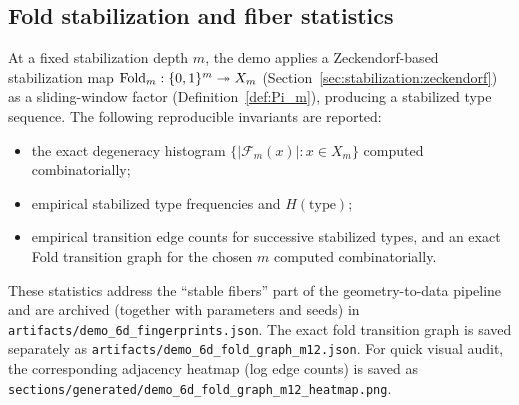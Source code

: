 \subsection{Fold stabilization and fiber statistics}
At a fixed stabilization depth $m$, the demo applies a Zeckendorf-based stabilization map $\mathrm{Fold}_m:\{0,1\}^m\twoheadrightarrow X_m$ (Section~\ref{sec:stabilization:zeckendorf}) as a sliding-window factor (Definition~\ref{def:Pi_m}), producing a stabilized type sequence. The following reproducible invariants are reported:
\begin{itemize}[leftmargin=*,itemsep=2pt]
  \item the exact degeneracy histogram $\{|\mathcal{F}_m(x)|:x\in X_m\}$ computed combinatorially;
  \item empirical stabilized type frequencies and $H(\text{type})$;
  \item empirical transition edge counts for successive stabilized types, and an exact Fold transition graph for the chosen $m$ computed combinatorially.
\end{itemize}
These statistics address the ``stable fibers'' part of the geometry-to-data pipeline and are archived (together with parameters and seeds) in \texttt{artifacts/demo\_6d\_fingerprints.json}.
The exact fold transition graph is saved separately as \texttt{artifacts/demo\_6d\_fold\_graph\_m12.json}.
For quick visual audit, the corresponding adjacency heatmap (log edge counts) is saved as \texttt{sections/generated/demo\_6d\_fold\_graph\_m12\_heatmap.png}.

